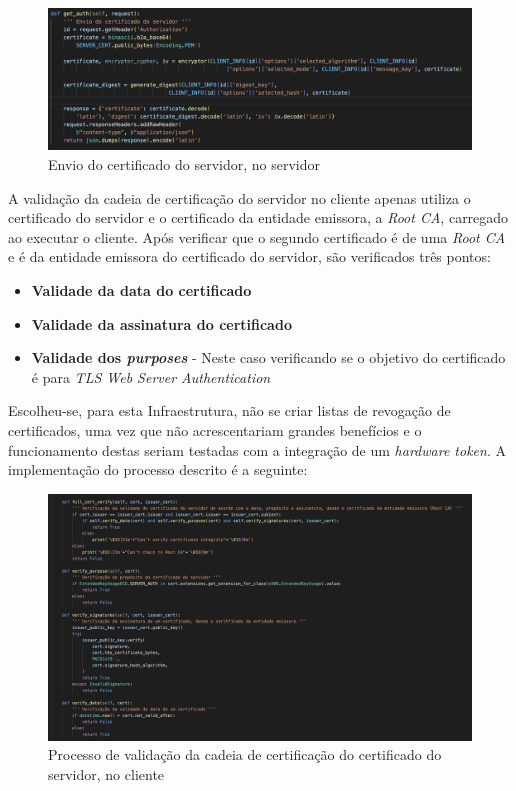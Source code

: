 \documentclass[10pt,english]{article}
\begin{document}
\clearpage

\begin{figure}[!h]
        \centering
        \includegraphics[width=\textwidth]{images/get_auth_server.png}
        \caption{Envio do certificado do servidor, no servidor}
\end{figure}

\par A validação da cadeia de certificação do servidor no cliente apenas utiliza o certificado do servidor e o certificado da entidade emissora, a \textit{Root CA}, carregado ao executar o cliente. Após verificar que o segundo certificado é de uma \textit{Root CA} e é da entidade emissora do certificado do servidor, são verificados três pontos:

\begin{itemize}
    \item \textbf{Validade da data do certificado}
    \item \textbf{Validade da assinatura do certificado}
    \item \textbf{Validade dos \textit{purposes}} - Neste caso verificando se o objetivo do certificado é para \textit{TLS Web Server Authentication}
\end{itemize}

\par Escolheu-se, para esta Infraestrutura, não se criar listas de revogação de certificados, uma vez que não acrescentariam grandes benefícios e o funcionamento destas seriam testadas com a integração de um \textit{hardware token}. A implementação do processo descrito é a seguinte:

\begin{figure}[!h]
        \centering
        \includegraphics[width=\textwidth]{images/cert_validation_client.png}
        \caption{Processo de validação da cadeia de certificação do certificado do servidor, no cliente}
\end{figure}
\end{document}
